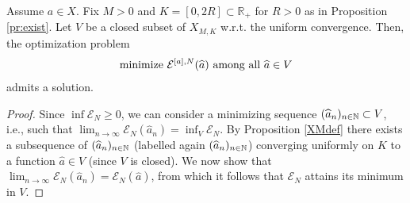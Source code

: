 \begin{proposition}\label{ENmin}
Assume $a \in X$. Fix $M > 0$ and $K=[0,2R] \subset  \mathbb R_+$ for $R>0$ as in Proposition \ref{pr:exist}. Let $V$ be a closed subset of $X_{M,K}$ w.r.t. the uniform convergence. Then, the optimization problem
\begin{align*}
	\mbox{minimize } \mathcal E^{[a],N}(\widehat a) \mbox{ among all } \widehat a \in V
\end{align*}
admits a solution.
\end{proposition}
\begin{proof}
Since $\inf \mathcal E_N \geq 0$, we can consider a minimizing sequence $(\widehat a_n)_{n \in \mathbb{N}} \subset V$, i.e., such that $\lim_{n \rightarrow \infty} \mathcal E_N(\widehat a_n) = \inf_{V} \mathcal E_N$. By Proposition \ref{XMdef} there exists a subsequence of $(\widehat a_n)_{n \in \mathbb{N}}$ (labelled again $(\widehat a_n)_{n \in \mathbb{N}}$) converging uniformly on $K$ to a function $\widehat a \in V$ (since $V$ is closed). We now show that $\lim_{n \rightarrow \infty} \mathcal E_N(\widehat a_n) = \mathcal  E_N(\widehat a)$, from which it follows  that $\mathcal  E_N$ attains its minimum in $V$. 


\end{proof}
